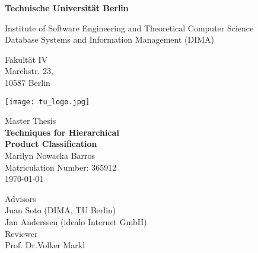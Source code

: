\thispagestyle{empty}
\begin{center}

\vspace*{1.4cm}
{\LARGE \textbf{Technische Universit\"at Berlin}}

\vspace{0.5cm}

{\large Institute of Software Engineering and Theoretical Computer Science\\[1mm]}
{\large Database Systems and Information Management (DIMA)\\[5mm]}

Fakult\"at IV\\
Marchstr. 23,\\
10587 Berlin\\

\vspace*{1cm}

\texttt{[image: tu\_logo.jpg]}

\vspace*{1.0cm}

{\LARGE Master Thesis}\\

\vspace{1.0cm}
{\LARGE \textbf{Techniques for Hierarchical}}\\
\vspace*{0.3cm}
{\LARGE \textbf{Product Classification}}\\
\vspace*{1.0cm}
{\LARGE Marilyn Nowacka Barros}
\\
\vspace*{0.5cm}
Matriculation Number: 365912\\
\today\\ %
\vspace*{1.0cm}

Advisors\\
Juan Soto (DIMA, TU Berlin)\\
Jan Anderssen (idealo Internet GmbH)\\
\vspace*{0.5cm}
Reviewer\\
Prof. Dr.Volker Markl
\vspace{3cm}


\end{center}

